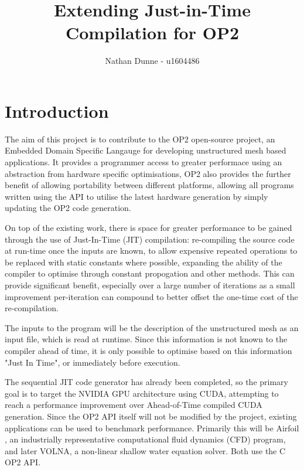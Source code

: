 \documentclass[11pt]{article}
\title{Extending Just-in-Time Compilation for OP2}
\author{Nathan Dunne - u1604486}
\begin{document}
\maketitle

\section*{Introduction}
The aim of this project is to contribute to the OP2 open-source project\cite{OP2rep}, an Embedded Domain Specific Langauge for developing unstructured mesh based applications. It provides a programmer access to greater performace using an abstraction from hardware specific optimisations, OP2 also provides the further benefit of allowing portability between different platforms, allowing all programs written using the API to utilise the latest hardware generation by simply updating the OP2 code generation. 
\par On top of the existing work, there is space for greater performance to be gained through the use of Just-In-Time (JIT) compilation: re-compiling the source code at run-time once the inputs are known, to allow expensive repeated operations to be replaced with static constants where possible, expanding the ability of the compiler to optimise through constant propogation and other methods. This can provide significant benefit, especially over a large number of iterations as a small improvement per-iteration can compound to better offset the one-time cost of the re-compilation. 
\par The inputs to the program will be the description of the unstructured mesh as an input file, which is read at runtime. Since this information is not known to the compiler ahead of time, it is only possible to optimise based on this information "Just In Time", or immediately before execution.
\par The sequential JIT code generator has already been completed, so the primary goal is to target the NVIDIA GPU architecture using CUDA, attempting to reach a performance improvement over Ahead-of-Time compiled CUDA generation. Since the OP2 API itself will not be modified by the project, existing applications can be used to benchmark performance. Primarily this will be Airfoil \cite{airfoil}, an industrially representative computational fluid dynamics (CFD) program, and later VOLNA\cite{volna}, a non-linear shallow water equation solver. Both use the C OP2 API.
\end{document}
